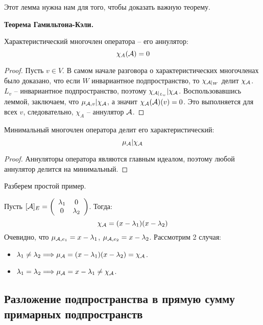 {Этот лемма нужна нам для того, чтобы доказать важную теорему.

\vspace*{3mm}

\textbf{Теорема Гамильтона-Кэли.} 

\quad\quad Характеристический многочлен оператора -- его аннулятор: \[ \chi_A(\mathcal{A}) = 0 \]

\begin{proof}
    Пусть $v \in V$.
    В самом начале разговора о характеристических многочленах было доказано, что если $W$ инвариантное подпространство, то $\chi_{\mathcal{A}|_W}$ делит $\chi_{\mathcal{A}}$.
    $L_v$ -- инвариантное подпространство, поэтому $\chi_{\mathcal{A}|_{L_v}} | \chi_{\mathcal{A}}$. 
    Воспользовавшись леммой, заключаем, что $\mu_{\mathcal{A}, v} | \chi_{\mathcal{A}}$, а значит $\chi_{\mathcal{A}}(\mathcal{A})(v) = 0$.
    Это выполняется для всех $v$, следовательно, $\chi_A$ -- аннулятор $\mathcal{A}$.
\end{proof}

\vspace*{3mm}

\follow Минимальный многочлен оператора делит его характеристический: \[ \mu_{\mathcal{A}} | \chi_{\mathcal{A}} \]
\begin{proof}
    Аннуляторы оператора являются главным идеалом, поэтому любой аннулятор делится на минимальный.
\end{proof}

\vspace*{3mm}

Разберем простой пример.

\begin{example}
    Пусть $[\mathcal{A}]_E = \left(\begin{array}{cc}
        \lambda_1 & 0 \\ 
        0 & \lambda_2
        \end{array}\right)$.
        Тогда: \[ \chi_{\mathcal{A}} = (x - \lambda_1)(x - \lambda_2) \]
        Очевидно, что $\mu_{\mathcal{A}, e_1} = x - \lambda_1$, $\mu_{\mathcal{A}, e_2} = x - \lambda_2$.
        Рассмотрим 2 случая:
        \begin{itemize}
            \item $ \lambda_1 \neq \lambda_2 \Longrightarrow \mu_{\mathcal{A}} = (x - \lambda_1) (x - \lambda_2) = \chi_{\mathcal{A}}$.
            \item $ \lambda_1 = \lambda_2 \Longrightarrow \mu_{\mathcal{A}} = x - \lambda_1 \neq \chi_{\mathcal{A}}$.
        \end{itemize} 
\end{example}


\subsection{Разложение подпространства в прямую сумму примарных подпространств}

}
